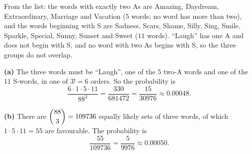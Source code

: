 From the list: the words with exactly two As are Amazing, Daydream, Extraordinary, Marriage and Vacation ($5$ words; no word has more than two), and the words beginning with S are Sadness, Scars, Shame, Silly, Sing, Smile, Sparkle, Special, Sunny, Sunset and Sweet ($11$ words). ``Laugh'' has one A and does not begin with S, and no word with two As begins with S, so the three groups do not overlap.

\textbf{(a)} The three words must be ``Laugh'', one of the $5$ two-A words and one of the $11$ S-words, in one of $3!=6$ orders. So the probability is
\[\dfrac{6\cdot1\cdot5\cdot11}{88^3}=\dfrac{330}{681472}=\boxed{\dfrac{15}{30976}}\approx0.00048.\]

\textbf{(b)} There are $\dbinom{88}{3}=109736$ equally likely sets of three words, of which $1\cdot5\cdot11=55$ are favourable. The probability is
\[\dfrac{55}{109736}=\boxed{\dfrac{5}{9976}}\approx0.00050.\]
